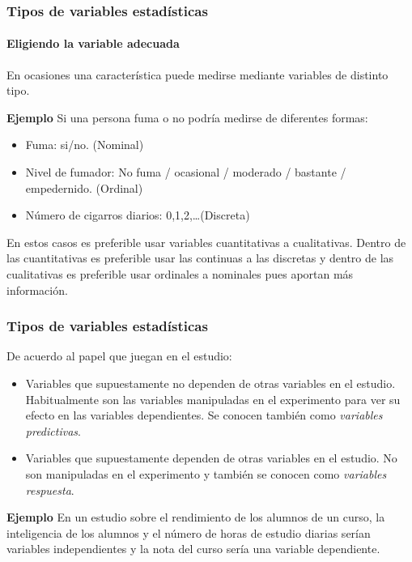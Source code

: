 \begin{frame}
\frametitle{Tipos de variables estadísticas}
\framesubtitle{Eligiendo la variable adecuada}
En ocasiones una característica puede medirse mediante variables de distinto tipo.

\textbf{Ejemplo} Si una persona fuma o no podría medirse de diferentes formas:
\begin{itemize}
\item Fuma: si/no. (Nominal)
\item Nivel de fumador: No fuma / ocasional / moderado / bastante / empedernido. (Ordinal)
\item Número de cigarros diarios: 0,1,2,\ldots (Discreta)
\end{itemize}

En estos casos es preferible usar variables cuantitativas a cualitativas.
Dentro de las cuantitativas es preferible usar las continuas a las discretas y dentro de las cualitativas es preferible usar ordinales a nominales pues aportan más información.

\begin{center}
\scalebox{1}{}
\end{center}
\end{frame}


\begin{frame}
\frametitle{Tipos de variables estadísticas}
De acuerdo al papel que juegan en el estudio:
\begin{itemize}
\item {} Variables que supuestamente no dependen de otras variables en el estudio.
Habitualmente son las variables manipuladas en el experimento para ver su efecto en las variables dependientes.
Se conocen también como \emph{variables predictivas}.
\item {} Variables que supuestamente dependen de otras variables en el estudio.
No son manipuladas en el experimento y también se conocen como \emph{variables respuesta}.
\end{itemize}

\textbf{Ejemplo} En un estudio sobre el rendimiento de los alumnos de un curso, la inteligencia de los alumnos y el número de horas de estudio diarias serían variables independientes y la nota del curso sería una variable dependiente.
\end{frame}


